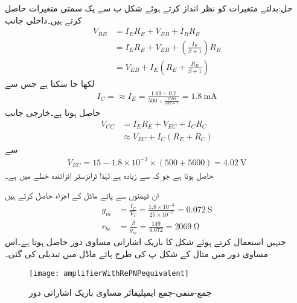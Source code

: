 حل:بدلتے متغیرات کو نظر انداز کرتے ہوئے شکل  ب سے یک سمتی متغیرات حاصل کرتے ہیں۔داخلی جانب 
\begin{align*}
V_{BB}&=I_E R_E+V_{EB}+I_B R_B\\
&=I_E R_E +V_{EB}+\left(\frac{I_E}{\beta+1}\right) R_B\\
&=V_{EB}+I_E \left(R_E+\frac{R_B}{\beta+1} \right)
\end{align*}
لکھا جا سکتا ہے جس سے
\begin{align*}
I_C= \approx I_E =\frac{1.69-0.7}{500+\frac{7500}{149+1}}=\SI{1.8}{\milli \ampere}
\end{align*}
حاصل ہوتا ہے۔خارجی جانب
\begin{align*}
V_{CC}&=I_E R_E +V_{EC}+I_C R_C \\
& \approx V_{EC}+I_C \left(R_E+R_C \right)
\end{align*}
سے
\begin{align*}
V_{EC}=15 -1.8 \times 10^{-3} \times \left(500+5600 \right)=\SI{4.02}{\volt}
\end{align*}
حاصل ہوتا ہے جو کہ  سے زیادہ ہے لہٰذا ٹرانزسٹر افزائندہ خطے میں ہے۔

ان قیمتوں سے پائے ماڈل کے اجزاء حاصل کرتے ہیں
\begin{align*}
g_m&=\frac{I_C}{V_T}=\frac{1.8 \times 10^{-3}}{25 \times 10^{-3}}=\SI{0.072}{\siemens}\\
r_{be}&=\frac{\beta}{g_m}=\frac{149}{0.072}=\SI{2069}{\ohm}
\end{align*}
جنہیں استعمال کرتے ہوئے شکل  کا باریک اشاراتی مساوی دور حاصل ہوتا ہے۔اس مساوی دور میں مثال  کے شکل  پ کی طرح پائے ماڈل میں تبدیلی کی گئی۔ 
\begin{figure}
\centering
\texttt{[image: amplifierWithRePNPequivalent]}
\caption{جمع-منفی-جمع ایمپلیفائر مساوی باریک اشاراتی دور}
\label{شکل_ٹرانزسٹر_جمع_منفی_جمع_امپلیفائر_مساوی}
\end{figure}

